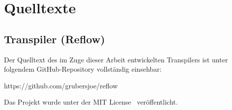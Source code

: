 \chapter{Quelltexte}

\section{Transpiler (Reflow)}

Der Quelltext des im Zuge dieser Arbeit entwickelten Transpilers ist unter folgendem GitHub-Repository vollständig einsehbar:

https://github.com/grubersjoe/reflow

Das Projekt wurde unter der MIT License~\autocite{license:mit} veröffentlicht.
